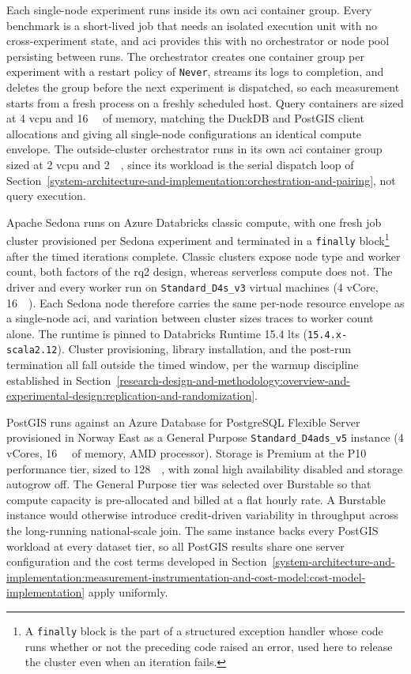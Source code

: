 Each single-node experiment runs inside its own \acrshort{aci} container group. Every benchmark is a short-lived job that needs an isolated execution unit with no cross-experiment state, and \acrshort{aci} provides this with no orchestrator or node pool persisting between runs. The orchestrator creates one container group per experiment with a restart policy of \texttt{Never}, streams its logs to completion, and deletes the group before the next experiment is dispatched, so each measurement starts from a fresh process on a freshly scheduled host. Query containers are sized at \num{4} \acrfull{vcpu} and \SI{16}{\gibi\byte} of memory, matching the DuckDB and PostGIS client allocations and giving all single-node configurations an identical compute envelope. The outside-cluster orchestrator runs in its own \acrshort{aci} container group sized at \num{2} \acrshort{vcpu} and \SI{2}{\gibi\byte}, since its workload is the serial dispatch loop of Section~\ref{system-architecture-and-implementation:orchestration-and-pairing}, not query execution.

Apache Sedona runs on Azure Databricks classic compute, with one fresh job cluster provisioned per Sedona experiment and terminated in a \texttt{finally} block\footnote{A \texttt{finally} block is the part of a structured exception handler whose code runs whether or not the preceding code raised an error, used here to release the cluster even when an iteration fails.} after the timed iterations complete. Classic clusters expose node type and worker count, both factors of the \acrshort{rq}2 design, whereas serverless compute does not. The driver and every worker run on \texttt{Standard\_D4s\_v3} virtual machines (\num{4} vCore, \SI{16}{\gibi\byte}). Each Sedona node therefore carries the same per-node resource envelope as a single-node \acrshort{aci}, and variation between cluster sizes traces to worker count alone. The runtime is pinned to Databricks Runtime 15.4 \acrfull{lts} (\texttt{15.4.x-scala2.12}). Cluster provisioning, library installation, and the post-run termination all fall outside the timed window, per the warmup discipline established in Section~\ref{research-design-and-methodology:overview-and-experimental-design:replication-and-randomization}.

PostGIS runs against an Azure Database for PostgreSQL Flexible Server provisioned in Norway East as a General Purpose \texttt{Standard\_D4ads\_v5} instance (\num{4} vCores, \SI{16}{\gibi\byte} of memory, AMD processor). Storage is Premium  at the P10 performance tier, sized to \SI{128}{\gibi\byte}, with zonal high availability disabled and storage autogrow off. The General Purpose tier was selected over Burstable so that compute capacity is pre-allocated and billed at a flat hourly rate. A Burstable instance would otherwise introduce credit-driven variability in throughput across the long-running national-scale join. The same instance backs every PostGIS workload at every dataset tier, so all PostGIS results share one server configuration and the cost terms developed in Section~\ref{system-architecture-and-implementation:measurement-instrumentation-and-cost-model:cost-model-implementation} apply uniformly.

